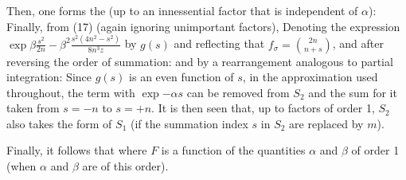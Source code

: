 \begin{paper}{1}
Then, one forms the  (up to an innessential factor that is independent of $\alpha$):
Finally, from (17) (again ignoring unimportant factors),
Denoting the expression $\exp{\beta\frac{s^2}{2n} - \beta^2\frac{s^2(4n^2-s^2)}{8n^3z}}$ by $g(s)$ and reflecting that $f_\sigma = \binom{2n}{n+s}$, and after reversing the order of summation:
and by a rearrangement analogous to partial integration:
Since $g(s)$ is an even function of $s$, in the approximation used throughout, the term with $\exp{-\alpha s}$ can be removed from $S_2$ and the sum for it taken from $s=-n$ to $s=+n$. It is then seen that, up to factors of order 1, $S_2$ also takes the form of $S_1$ (if the summation index $s$ in $S_2$ are replaced by $m$).

Finally, it follows that
where $F$ is a function of the quantities $\alpha$ and $\beta$ of order 1 (when $\alpha$ and $\beta$ are of this order).


\end{paper}
